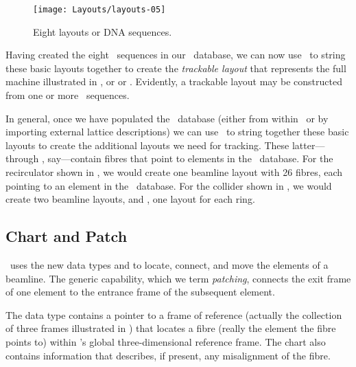 \begin{figure}[ht]%
  \centering
  \texttt{[image: Layouts/layouts-05]}
  \caption{Eight layouts or DNA sequences.}
  \label{fig:CEBAF.DNA}
\end{figure}

%
Having created the eight \DNA\ sequences in our \DNA\ database,
we can now use \PTC\ to string these basic layouts together to
create the \emph{trackable layout} that represents the full machine
illustrated in , or 
or . Evidently, a trackable layout may be constructed
from one or more \DNA\ sequences.%

In general, once we have populated the \DNA\ database (either
from within \PTC\ or by importing external lattice descriptions) we
can use \PTC\ to string together these basic layouts to create
the additional layouts we need for tracking. These latter---
through , say---contain fibres that point to elements
in the \DNA\ database. For the recirculator shown in
, we would create one beamline layout 
with 26 fibres, each pointing to an element in the \DNA\ database.
For the collider shown in , we would create two
beamline layouts,  and , one layout for
each ring.


\subsection{Chart and Patch}
\label{sec:chart.patch}

%
\PTC\ uses  the new data types  and 
to locate, connect, and move the elements of a beamline. The
generic capability, which we term \emph{patching}, connects the
exit frame of one element to the entrance frame of the subsequent
element.

%
The data type  contains a pointer to a frame of
reference (actually the collection of three frames illustrated in
) that locates a fibre (really the element the
fibre points to) within \PTC's global three-dimensional reference
frame. The chart also contains information that describes, if present,
any misalignment of the fibre.

